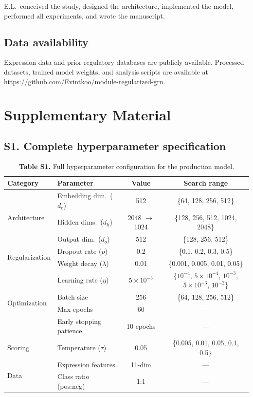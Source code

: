 \documentclass[10pt,twocolumn]{article}
\begin{document}
E.L.\ conceived the study, designed the architecture, implemented the model, performed all experiments, and wrote the manuscript.

\subsection*{Data availability}

Expression data and prior regulatory databases are publicly available.
Processed datasets, trained model weights, and analysis scripts are available at \url{https://github.com/Evintkoo/module-regularized-grn}.





\clearpage
\onecolumn
\appendix
\section*{Supplementary Material}

\subsection*{S1. Complete hyperparameter specification}

\begin{table}[H]
\centering
\caption*{\textbf{Table S1.} Full hyperparameter configuration for the production model.}
\small
\begin{tabular}{@{}llcc@{}}
\toprule
\textbf{Category} & \textbf{Parameter} & \textbf{Value} & \textbf{Search range} \\
\midrule
\multirow{3}{*}{Architecture} & Embedding dim.\ ($d_e$) & 512 & \{64, 128, 256, 512\} \\
 & Hidden dims.\ ($d_h$) & 2048 $\to$ 1024 & \{128, 256, 512, 1024, 2048\} \\
 & Output dim.\ ($d_o$) & 512 & \{128, 256, 512\} \\
\midrule
\multirow{2}{*}{Regularization} & Dropout rate ($p$) & 0.2 & \{0.1, 0.2, 0.3, 0.5\} \\
 & Weight decay ($\lambda$) & 0.01 & \{0.001, 0.005, 0.01, 0.05\} \\
\midrule
\multirow{4}{*}{Optimization} & Learning rate ($\eta$) & $5\times10^{-3}$ & \{$10^{-4}$, $5\times10^{-4}$, $10^{-3}$, $5\times10^{-3}$, $10^{-2}$\} \\
 & Batch size & 256 & \{64, 128, 256, 512\} \\
 & Max epochs & 60 & --- \\
 & Early stopping patience & 10 epochs & --- \\
\midrule
Scoring & Temperature ($\tau$) & 0.05 & \{0.005, 0.01, 0.05, 0.1, 0.5\} \\
\midrule
\multirow{2}{*}{Data} & Expression features & 11-dim & --- \\
 & Class ratio (pos:neg) & 1:1 & --- \\
\bottomrule
\end{tabular}
\end{table}
\end{document}
